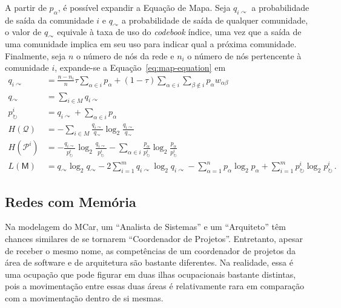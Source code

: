 \documentclass[12pt,a4paper]{article}
\begin{document}
A partir de $p_\alpha$, é possível expandir a Equação de Mapa. Seja $q_{i \curvearrowright}$ a probabilidade de saída da comunidade $i$ e $q_{\curvearrowright}$ a probabilidade de saída de qualquer comunidade, o valor de $q_{\curvearrowright}$ equivale à taxa de uso do \textit{codebook} índice, uma vez que a saída de uma comunidade implica  em seu uso para indicar qual a próxima comunidade. Finalmente, seja $n$ o número de nós da rede e $n_i$ o número de nós pertencente à comunidade $i$, expande-se a Equação~\ref{eq:map-equation} em
\begin{align}
q_{i \curvearrowright} &= \frac{n - n_i}{n} \tau \sum_{\alpha \in i} p_\alpha + (1 - \tau) \sum_{\alpha \in i} \sum_{\beta \nin i} p_\alpha w_{\alpha \beta} \nonumber \\
q_\curvearrowright       &= \sum_{i \in M} q_{i\curvearrowright} \nonumber \\
p^i_\circlearrowright    &= q_{i \curvearrowright} + \sum_{\alpha \in i} p_\alpha \nonumber \\
H(\mathcal{Q})            &= - \sum_{i \in M} \frac{q_{i \curvearrowright}}{q_\curvearrowright} \log_2 \frac{q_{i \curvearrowright}}{q_\curvearrowright} \nonumber \\
H(\mathcal{P}^i)         &= - \frac{q_{i \curvearrowright}}{p^i_\circlearrowright} \log_2 \frac{q_{i \curvearrowright}}{p^i_\circlearrowright} 
-  \sum_{\alpha \in i} \frac{p_\alpha}{p^i_\circlearrowright} \log_2  \frac{p_\alpha}{p^i_\circlearrowright} \label{eq:eta-p} \\
L(\mathsf{M})              &= q_\curvearrowright \log_2 q_\curvearrowright - 2 \sum_{i = 1}^m q_{i \curvearrowright} \log_2 q_{i \curvearrowright} - \sum_{\alpha = 1}^n p_\alpha \log_2 p_\alpha + \sum_{i = 1}^m p^i_\circlearrowright \log_2 p^i_\circlearrowright\,. \nonumber
\end{align}

\subsection{Redes com Memória}  \label{sec:redes-com-memoria}

Na modelagem do MCar, um \enquote{Analista de Sistemas} e um \enquote{Arquiteto} têm chances similares de se tornarem \enquote{Coordenador de Projetos}. Entretanto, apesar de receber o mesmo nome, as competências de um coordenador de projetos da área de software e de arquitetura são bastante diferentes. Na realidade, essa é uma ocupação que pode figurar em duas ilhas ocupacionais bastante distintas, pois a movimentação entre essas duas áreas é relativamente rara em comparação com a movimentação dentro de si mesmas.
\end{document}
